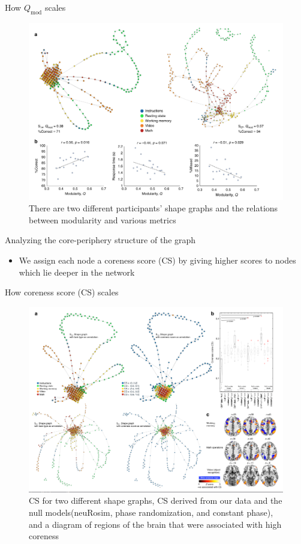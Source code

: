 \documentclass{beamer}
\begin{document}
\begin{frame}{How $Q_{\mathrm{mod}}$ scales}
    \begin{figure}
        \includegraphics[width = 0.75\linewidth]{fig3.png}
        \caption{There are two different participants' shape graphs and the relations between modularity and various metrics}
    \end{figure}
\end{frame}

\begin{frame}{Analyzing the core-periphery structure of the graph}
    \begin{itemize}
        \item We assign each node a coreness score (CS) by giving higher scores to nodes which lie deeper in the network
    \end{itemize}
\end{frame}

\begin{frame}{How coreness score (CS) scales}
    \begin{figure}
        \includegraphics[width = 0.7\linewidth]{fig4.png}
        \caption{CS for two different shape graphs, CS derived from our data and the null models(neuRosim, phase randomization, and constant phase), and a diagram of regions of the brain that were associated with high coreness}
    \end{figure}
\end{frame}
\end{document}
